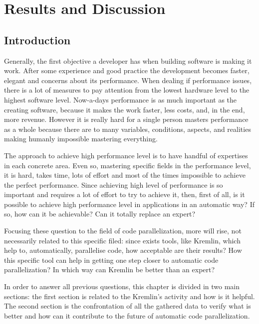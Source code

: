 \chapter{Results and Discussion}\label{chap:chap5}

\section*{}

\section{Introduction}

Generally, the first objective a developer has when building software is making it work. After some experience and good practice the development becomes faster, elegant and concerns about its performance. When dealing if performance issues, there is a lot of measures to pay attention from the lowest hardware level to the highest software level. Now-a-days performance is as much important as the creating software, because it makes the work faster, less costs, and, in the end, more revenue. However it is really hard for a single person masters performance as a whole because there are to many variables, conditions, aspects, and realities making humanly impossible mastering everything.

The approach to achieve high performance level is to have handful of expertises in each concrete area. Even so, mastering specific fields in the performance level, it is hard, takes time, lots of effort and most of the times impossible to achieve the perfect performance. Since achieving high level of performance is so important and requires a lot of effort to try to achieve it, then, first of all, is it possible to achieve high performance level in applications in an automatic way? If so, how can it be achievable? Can it totally replace an expert?

Focusing these question to the field of code parallelization, more will rise, not necessarily related to this specific filed: since exists tools, like Kremlin, which help to, automatically, parallelise code, how acceptable are their results? How this specific tool can help in getting one step closer to automatic code parallelization? In which way can Kremlin be better than an expert?

In order to answer all previous questions, this chapter is divided in two main sections: the first section is related to the Kremlin's activity and how is it helpful. The second section is the confrontation of all the gathered data to verify what is better and how can it contribute to the future of automatic code parallelization. 


